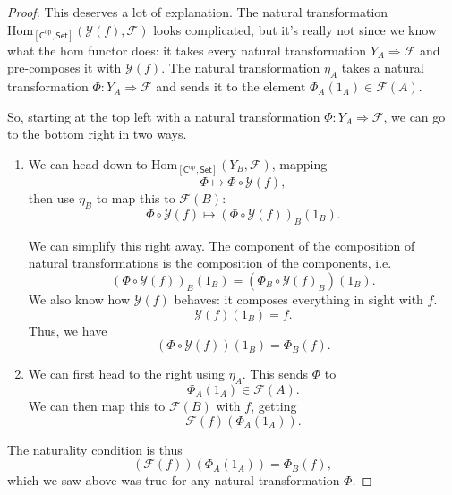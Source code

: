 \documentclass[a4paper]{report}
\newcommand{\Hom}{\mathrm{Hom}}
\theoremstyle{definition}
\theoremstyle{plain}
\theoremstyle{remark}
\begin{document}
\begin{proof}
  This deserves a lot of explanation. The natural transformation $\Hom_{[\mathsf{C}^{\text{op}}, \mathsf{Set}]}(\mathcal{Y}(f), \mathcal{F})$ looks complicated, but it's really not since we know what the hom functor does: it takes every natural transformation $Y_{A} \Rightarrow \mathcal{F}$ and pre-composes it with $\mathcal{Y}(f)$. The natural transformation $\eta_{A}$ takes a natural transformation $\Phi\colon Y_{A} \Rightarrow \mathcal{F}$ and sends it to the element $\Phi_{A}(1_{A}) \in \mathcal{F}(A)$.

  So, starting at the top left with a natural transformation $\Phi\colon Y_{A} \Rightarrow \mathcal{F}$, we can go to the bottom right in two ways.
  \begin{enumerate}
    \item We can head down to $\Hom_{[\mathsf{C}^{\text{op}}, \mathsf{Set}]}(Y_{B}, \mathcal{F})$, mapping 
      \begin{equation*}
        \Phi \mapsto \Phi \circ \mathcal{Y}(f),
      \end{equation*}
      then use $\eta_{B}$ to map this to $\mathcal{F}(B)$:
      \begin{equation*}
        \Phi \circ \mathcal{Y}(f) \mapsto (\Phi \circ \mathcal{Y}(f))_{B}(1_{B}).
      \end{equation*}

      We can simplify this right away. The component of the composition of natural transformations is the composition of the components, i.e.
      \begin{equation*}
        (\Phi \circ \mathcal{Y}(f))_{B}(1_{B}) = (\Phi_{B} \circ \mathcal{Y}(f)_{B})(1_{B}).
      \end{equation*}
      We also know how $\mathcal{Y}(f)$ behaves: it composes everything in sight with $f$.
      \begin{equation*}
        \mathcal{Y}(f)(1_{B}) = f.
      \end{equation*}
      Thus, we have
      \begin{equation*}
        (\Phi \circ \mathcal{Y}(f))(1_{B}) = \Phi_{B}(f).
      \end{equation*}

    \item We can first head to the right using $\eta_{A}$. This sends $\Phi$ to 
      \begin{equation*}
        \Phi_{A}(1_{A}) \in \mathcal{F}(A).
      \end{equation*}
      We can then map this to $\mathcal{F}(B)$ with $f$, getting
      \begin{equation*}
        \mathcal{F}(f)(\Phi_{A}(1_{A})).
      \end{equation*}
  \end{enumerate}

  The naturality condition is thus
  \begin{equation*}
    (\mathcal{F}(f))(\Phi_{A}(1_{A})) = \Phi_{B}(f),
  \end{equation*}
  which we saw above was true for any natural transformation $\Phi$.
\end{proof}
\end{document}
